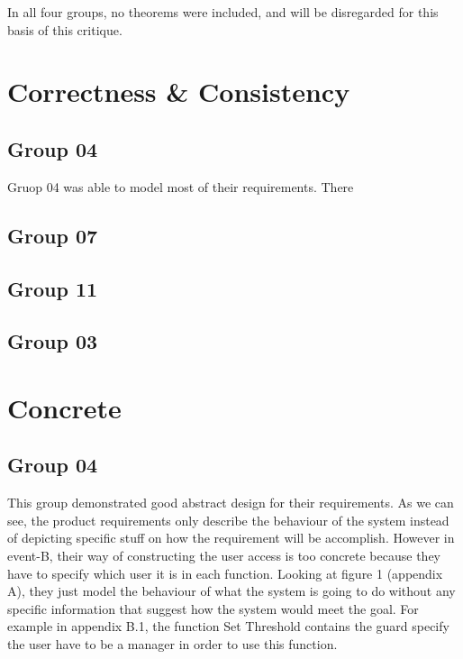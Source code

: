 In all four groups, no theorems were included, and will be disregarded for this basis of this critique.

\section{Correctness \& Consistency}
\label{correctnessconsistency}

\subsection{Group 04}
\label{group04}

Gruop 04 was able to model most of their requirements. There 

\subsection{Group 07}
\label{group07}

\subsection{Group 11}
\label{group11}

\subsection{Group 03}
\label{group03}

\section{Concrete}
\label{concrete}

\subsection{Group 04}
\label{group04}

This group demonstrated good abstract design for their requirements. As we can see, the product requirements only describe the behaviour of the system instead of depicting specific stuff on how the requirement will be accomplish. However in event-B, their way of constructing the user access is too concrete because they have to specify which user it is in each function. Looking at figure 1 (appendix A), they just model the behaviour of what the system is going to do without any specific information that suggest how the system would meet the goal. For example in appendix B.1, the function Set Threshold contains the guard specify the user have to be a manager in order to use this function. 

